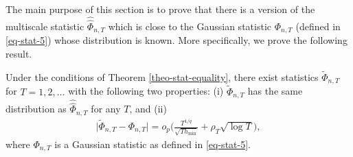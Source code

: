 \documentclass[a4paper,12pt]{article}
\newcommand{\doublehattwo}[1]{\widehat{\widehat{#1}}}
\begin{document}
The main purpose of this section is to prove that there is a version of the multiscale statistic $\doublehattwo{\Phi}_{n,T}$ which is close to the Gaussian statistic $\Phi_{n,T}$ (defined in \eqref{eq-stat-5}) whose distribution is known. More specifically, we prove the following result. 

\begin{propA}\label{propA-strong-approx-equality}
Under the conditions of Theorem \ref{theo-stat-equality}, there exist statistics $\widetilde{\Phi}_{n,T}$ for $T = 1,2,\ldots$ with the following two properties: (i) $\widetilde{\Phi}_{n, T}$ has the same distribution as $\doublehattwo{\Phi}_{n, T}$ for any $T$, and (ii)
\begin{align}\label{eq-strong-approx-equality}
\big| \widetilde{\Phi}_{n, T} - \Phi_{n,T} \big| = o_p \Big( \frac{T^{1/q}}{\sqrt{T h_{\min}}} + \rho_T\sqrt{\log T} \Big),
\end{align}
where $\Phi_{n,T}$ is a Gaussian statistic as defined in \eqref{eq-stat-5}. 
\end{propA}
\end{document}
